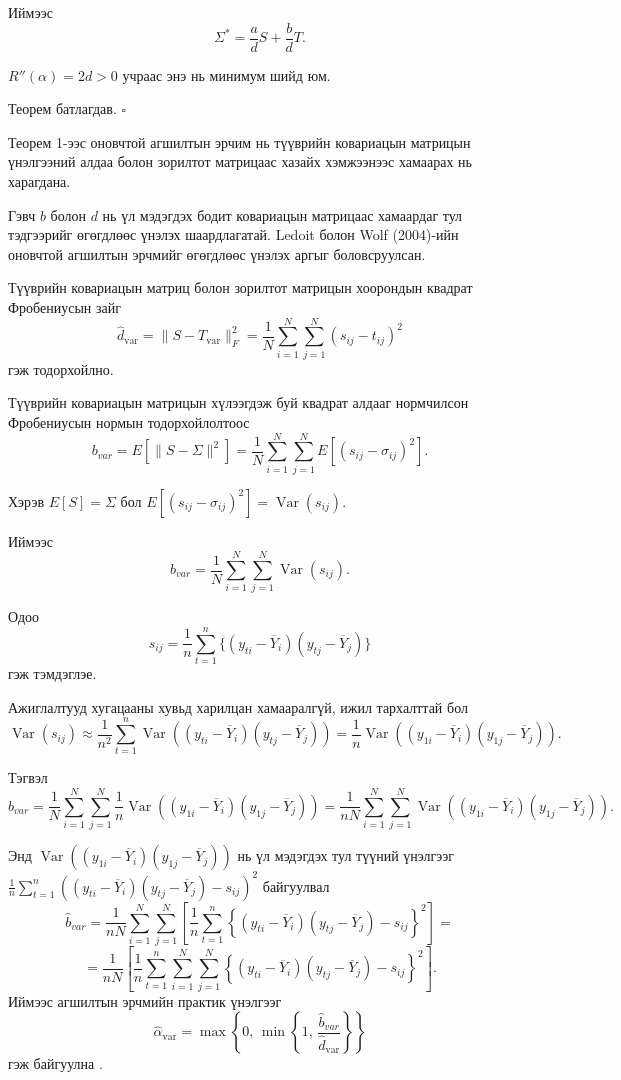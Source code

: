 Иймээс
\[
\Sigma^*
=
\frac{a}{d}S
+
\frac{b}{d}T.
\]

$R''(\alpha)=2d>0$ учраас
энэ нь минимум шийд юм.

Теорем батлагдав. \hfill $\square$

\medskip



Теорем 1-ээс оновчтой агшилтын
эрчим нь түүврийн ковариацын матрицын
үнэлгээний алдаа болон зорилтот
матрицаас хазайх хэмжээнээс
хамаарах нь харагдана.

Гэвч $b$ болон $d$ нь үл мэдэгдэх
бодит ковариацын матрицаас хамаардаг
тул тэдгээрийг өгөгдлөөс үнэлэх
шаардлагатай. Ledoit болон Wolf (2004)-ийн
оновчтой агшилтын
эрчмийг өгөгдлөөс үнэлэх аргыг
боловсруулсан.

Түүврийн ковариацын матриц болон
зорилтот матрицын хоорондын
квадрат Фробениусын зайг
\[
\widehat{d}_{\mathrm{var}}
=
\|S-T_{\mathrm{var}}\|_F^2
=
\frac{1}{N}\sum_{i=1}^{N}\sum_{j=1}^{N}
(s_{ij}-t_{ij})^2
\]
гэж тодорхойлно.

Түүврийн ковариацын матрицын хүлээгдэж буй
квадрат алдааг нормчилсон Фробениусын нормын
тодорхойлолтоос
\[
b_{var}=E\left[\|S-\Sigma\|^2\right]=\frac{1}{N}
\sum_{i=1}^{N}\sum_{j=1}^{N}
E\left[(s_{ij}-\sigma_{ij})^2\right].
\]

Хэрэв $E[S]=\Sigma$ бол $E\left[(s_{ij}-\sigma_{ij})^2\right]
=
\operatorname{Var}(s_{ij}).$

Иймээс
\[
b_{var}
=
\frac{1}{N}
\sum_{i=1}^{N}\sum_{j=1}^{N}
\operatorname{Var}(s_{ij}).
\]

Одоо
\[
s_{ij}=\frac{1}{n}\sum_{t=1}^{n}\{(y_{ti}-\overline{Y}_i)
(y_{tj}-\overline{Y}_j)\}
\]
гэж тэмдэглэе.

Ажиглалтууд хугацааны хувьд
харилцан хамааралгүй, ижил тархалттай
бол
\[
\operatorname{Var}(s_{ij})\approx
\frac{1}{n^2}
\sum_{t=1}^{n}\operatorname{Var}\left((y_{ti}-\overline{Y}_i)
(y_{tj}-\overline{Y}_j)\right)=
\frac{1}{n}\operatorname{Var}\left((y_{1i}-\overline{Y}_i)
(y_{1j}-\overline{Y}_j)\right).
\]

Тэгвэл
\[
b_{var}=\frac{1}{N}
\sum_{i=1}^{N}\sum_{j=1}^{N}
\frac{1}{n}\operatorname{Var}\left((y_{1i}-\overline{Y}_i)
(y_{1j}-\overline{Y}_j)\right)=
\frac{1}{nN}
\sum_{i=1}^{N}\sum_{j=1}^{N}
\operatorname{Var}\left((y_{1i}-\overline{Y}_i)
(y_{1j}-\overline{Y}_j)\right).
\]

Энд $\operatorname{Var}\left((y_{1i}-\overline{Y}_i)
(y_{1j}-\overline{Y}_j)\right)$ нь
үл мэдэгдэх тул түүний үнэлгээг $\frac{1}{n}
\sum_{t=1}^{n}((y_{ti}-\overline{Y}_i)
(y_{tj}-\overline{Y}_j)-s_{ij})^2$ байгуулвал
\[
\widehat{b}_{var}=
\frac{1}{nN}
\sum_{i=1}^{N}\sum_{j=1}^{N}
\left[
\frac{1}{n}\sum_{t=1}^{n}
\left\{(y_{ti}-\overline{Y}_i)
(y_{tj}-\overline{Y}_j)-s_{ij}\right\}^2
\right]=
\]
\[=
\frac{1}{nN}
\left[
\frac{1}{n}
\sum_{t=1}^{n}
\sum_{i=1}^{N}\sum_{j=1}^{N}
\left\{(y_{ti}-\overline{Y}_i)
(y_{tj}-\overline{Y}_j)-s_{ij}\right\}^2
\right].
\]
Иймээс агшилтын эрчмийн
практик үнэлгээг
\[
\widehat{\alpha}_{\mathrm{var}}
=
\max\left\{
0,\,
\min\left\{
1,\,
\frac{\widehat{b}_{var}}
{\widehat{d}_{\mathrm{var}}}
\right\}
\right\}
\]
гэж байгуулна \citep{ledoitwolf2004b}.


